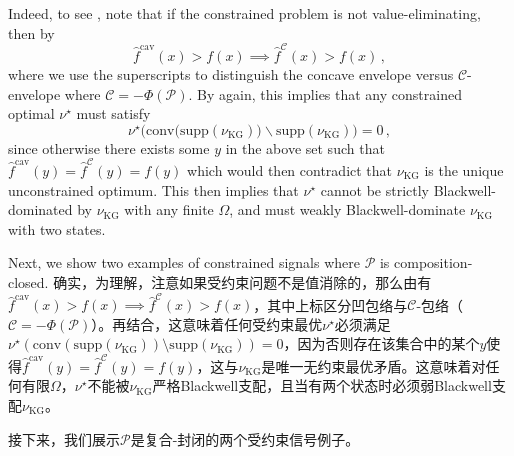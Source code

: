 \documentclass[12pt,letterpaper]{article}
\newenvironment{original}{\color{black}}{}
\newenvironment{translation}{\color{blue}}{}
\newcommand*\supp{\mathrm{supp}}
\theoremstyle{plain}
\theoremstyle{definition}
\theoremstyle{remark}
\newcommand{\Pc}{\mathcal{P}}
\newcommand{\C}{\mathcal{C}}
\theoremstyle{definition}
\begin{document}
\begin{original}
Indeed, to see , note that if the constrained problem is not value-eliminating, then by 
\[\widehat{f}^{\text{cav}}(x) > f(x) \implies \widehat{f}^{\C}(x) > f(x)\,,\]
where we use the superscripts to distinguish the concave envelope versus $\C$-envelope where $\C = -\Phi(\Pc)$. By   again, this implies that any constrained optimal $\nu^\star$ must satisfy
\[\nu^\star\Big(\text{conv}\big(\supp(\nu_{\text{KG}})\big) \backslash \supp(\nu_{\text{KG}})\Big) = 0\,,\]
since otherwise there exists some $y$ in the above set such that $\widehat{f}^{\text{cav}}(y) = \widehat{f}^\C(y) = f(y)$ which would then contradict that $\nu_{\text{KG}}$ is the unique unconstrained optimum. This then implies that $\nu^\star$ cannot be strictly Blackwell-dominated by $\nu_{\text{KG}}$ with any finite $\Omega$, and must weakly Blackwell-dominate $\nu_{\text{KG}}$ with two states.

Next, we show two examples of constrained signals where $\Pc$ is composition-closed.
\end{original}
\begin{translation}
确实，为理解，注意如果受约束问题不是值消除的，那么由有$\widehat{f}^{\text{cav}}(x) > f(x) \implies \widehat{f}^{\C}(x) > f(x)$，其中上标区分凹包络与$\C$-包络（$\C = -\Phi(\Pc)$）。再结合，这意味着任何受约束最优$\nu^\star$必须满足$\nu^\star(\text{conv}(\supp(\nu_{\text{KG}})) \setminus \supp(\nu_{\text{KG}})) = 0$，因为否则存在该集合中的某个$y$使得$\widehat{f}^{\text{cav}}(y) = \widehat{f}^\C(y) = f(y)$，这与$\nu_{\text{KG}}$是唯一无约束最优矛盾。这意味着对任何有限$\Omega$，$\nu^\star$不能被$\nu_{\text{KG}}$严格Blackwell支配，且当有两个状态时必须弱Blackwell支配$\nu_{\text{KG}}$。

接下来，我们展示$\Pc$是复合-封闭的两个受约束信号例子。
\end{translation}
\end{document}
